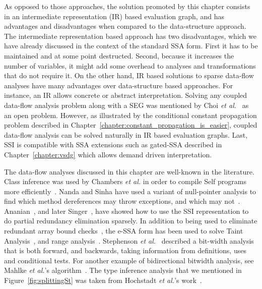 {As opposed to those approaches, the solution promoted by this chapter consists in an intermediate representation (IR) based evaluation graph, and has advantages and disadvantages when compared to the data-structure approach.
The intermediate representation based approach has two disadvantages, which we have already discussed in the context of the standard SSA form.
First it has to be maintained and at some point destructed.
Second, because it increases the number of variables, it might add some overhead to analyses and transformations that do not require it.
On the other hand, IR based solutions to sparse data-flow analyses have many advantages over data-structure based approaches.
For instance, an IR allows concrete or abstract interpretation.
Solving any coupled data-flow analysis problem along with a SEG was mentioned by Choi {\em et al.}~\cite{Choi91} as an open problem.
However, as illustrated by the conditional constant propagation problem described in Chapter~\ref{chapter:constant_propagation_is_easier}, coupled data-flow analysis can be solved naturally in IR based evaluation graphs.
Last, SSI is compatible with SSA extensions such as gated-SSA described in Chapter~\ref{chapter:vsdg} which allows demand driven interpretation.

The data-flow analyses discussed in this chapter are well-known in the literature.
Class inference was used by Chambers {\em et al.} in order to compile Self programs more efficiently~\cite{Chambers89}.
Nanda and Sinha have used a variant of null-pointer analysis to find which method dereferences may throw exceptions, and which may not~\cite{Nanda09}.
Ananian~\cite{Ananian99}, and later Singer~\cite{Singer06}, have showed how to use the SSI representation to do partial redundancy elimination sparsely.
In addition to being used to eliminate redundant array bound checks~\cite{Bodik00}, the e-SSA form has been used to solve Taint Analysis~\cite{Rimsa11}, and range analysis~\cite{Su05,Gawlitza09}.
Stephenson {\em et al.}~\cite{Stephenson00} described a bit-width analysis that is both forward, and backwards, taking information from definitions, uses and conditional tests.
For another example of bidirectional bitwidth analysis, see Mahlke {\em et al.}'s algorithm~\cite{Mahlke01}.
The type inference analysis that we mentioned in Figure~\ref{fig:splittingSt} was taken from Hochstadt {\em et al.}'s work~\cite{Hochstadt08}.

}
